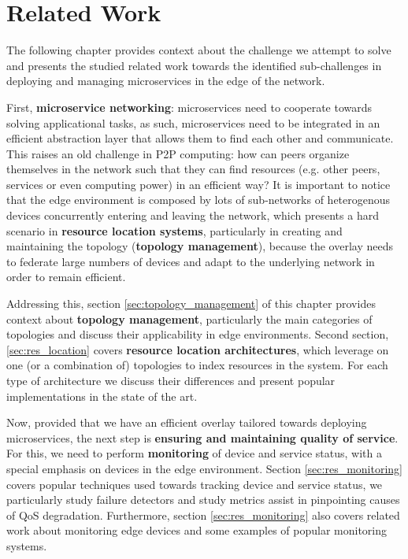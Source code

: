\chapter{Related Work} \label{cha:related_work}

The following chapter provides context about the challenge we attempt to solve and presents the studied related work towards the identified sub-challenges in deploying and managing microservices in the edge of the network. 

First, \textbf{microservice networking}: microservices need to cooperate towards solving applicational tasks, as such, microservices need to be integrated in an efficient abstraction layer that allows them to find each other and communicate. This raises an old challenge in P2P computing: how can peers organize themselves in the network such that they can find resources (e.g. other peers, services or even computing power) in an efficient way? It is important to notice that the edge environment is composed by lots of sub-networks of heterogenous devices concurrently entering and leaving the network, which presents a hard scenario in \textbf{resource location systems}, particularly in creating and maintaining the topology (\textbf{topology management}), because the overlay needs to federate large numbers of devices and adapt to the underlying network in order to remain efficient. 

Addressing this, section \ref{sec:topology_management} of this chapter provides context about \textbf{topology management}, particularly the main categories of topologies and discuss their applicability in edge environments. Second section, \ref{sec:res_location} covers \textbf{resource location architectures}, which leverage on one (or a combination of) topologies to index resources in the system. For each type of architecture we discuss their differences and present popular implementations in the state of the art. 

Now, provided that we have an efficient overlay tailored towards deploying microservices, the next step is \textbf{ensuring and maintaining quality of service}. For this, we need to perform \textbf{monitoring} of device and service status, with a special emphasis on devices in the edge environment. Section \ref{sec:res_monitoring} covers popular techniques used towards tracking device and service status, we particularly study failure detectors and study metrics assist in pinpointing causes of QoS degradation. Furthermore, section \ref{sec:res_monitoring} also covers related work about monitoring edge devices and some examples of popular monitoring systems.

